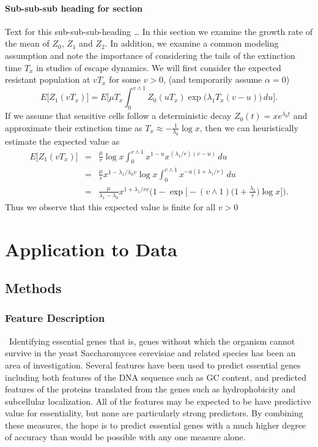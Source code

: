 \documentclass{bmcart}
\begin{document}
\paragraph*{Sub-sub-sub heading for section}
Text for this sub-sub-sub-heading \ldots
In this section we examine the growth rate of the mean of $Z_0$, $Z_1$ and $Z_2$. In
addition, we examine a common modeling assumption and note the
importance of considering the tails of the extinction time $T_x$ in
studies of escape dynamics.
We will first consider the expected resistant population at $vT_x$ for
some $v>0$, (and temporarily assume $\alpha=0$)
%
\[
 E \bigl[Z_1(vT_x) \bigr]= E
\biggl[\mu T_x\int_0^{v\wedge
1}Z_0(uT_x)
\exp \bigl(\lambda_1T_x(v-u) \bigr)\,du \biggr].
\]
%
If we assume that sensitive cells follow a deterministic decay
$Z_0(t)=xe^{\lambda_0 t}$ and approximate their extinction time as
$T_x\approx-\frac{1}{\lambda_0}\log x$, then we can heuristically
estimate the expected value as
%
\begin{eqnarray}\label{eqexpmuts}
E\bigl[Z_1(vT_x)\bigr] &=& \frac{\mu}{r}\log x
\int_0^{v\wedge1}x^{1-u}x^{({\lambda_1}/{r})(v-u)}\,du
\nonumber\\
&=& \frac{\mu}{r}x^{1-{\lambda_1}/{\lambda_0}v}\log x\int_0^{v\wedge
1}x^{-u(1+{\lambda_1}/{r})}\,du
\nonumber\\
&=& \frac{\mu}{\lambda_1-\lambda_0}x^{1+{\lambda_1}/{r}v} \biggl(1-\exp \biggl[-(v\wedge1) \biggl(1+
\frac{\lambda_1}{r}\biggr)\log x \biggr] \biggr).
\end{eqnarray}
%
Thus we observe that this expected value is finite for all $v>0$ %

\section*{Application to Data}

\subsection*{Methods}

\subsubsection*{Feature Description}\label{subsubsection:feature}\
Identifying essential genes that is, genes without which the organism cannot survive in the yeast Saccharomyces cerevisiae  \citep{Seringhaus2006a} and related species has been an area of investigation. Several features have been used to predict essential genes including both features of the DNA sequence such as GC content, and predicted features of the proteins translated from the genes such as hydrophobicity and subcellular localization. All of the features may be expected to be have predictive value for essentiality, but none are particularly strong predictors. By combining these measures, the hope is to predict essential genes with a much higher degree of accuracy than would be possible with any one measure alone.
  
\end{document}
